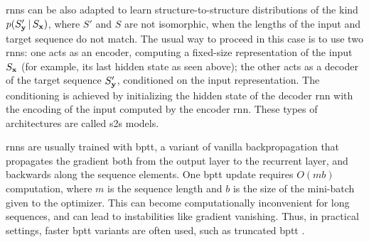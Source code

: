 \glspl{rnn} can be also adapted to learn structure-to-structure distributions of the kind $p(S'_\Vector{y} \given S_\Vector{x})$, where $S'$ and $S$ are not isomorphic, \ie when the lengths of the input and target sequence do not match. The usual way to proceed in this case is to use two \glspl{rnn}: one acts as an encoder, computing a fixed-size representation of the input $S_\Vector{x}$ (for example, its last hidden state as seen above); the other acts as a decoder of the target sequence $S'_\Vector{y}$, conditioned on the input representation. The conditioning is achieved by initializing the hidden state of the decoder \gls{rnn} with the encoding of the input computed by the encoder \gls{rnn}. These types of architectures are called \gls{s2s} models.

\glspl{rnn} are usually trained with \gls{bptt}, a variant of vanilla backpropagation that propagates the gradient both from the output layer to the recurrent layer, and backwards along the sequence elements. One \gls{bptt} update requires $O(mb)$ computation, where $m$ is the sequence length and $b$ is the size of the mini-batch given to the optimizer. This can become computationally inconvenient for long sequences, and can lead to instabilities like gradient vanishing. Thus, in practical settings, faster \gls{bptt} variants are often used, such as truncated \gls{bptt} \cite{?}. 

